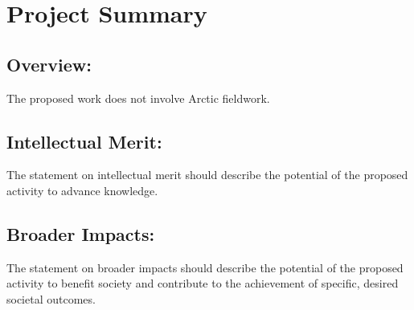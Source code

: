 \section*{\hfil Project Summary\hfil}
\vspace{-16pt}
\noindent\hrulefill





\vspace{-8pt}
\subsection*{Overview:} 
\vspace{-7pt}

The proposed work does not involve Arctic fieldwork.




\vspace{-8pt}
\subsection*{Intellectual Merit:}
\vspace{-7pt}

The statement on intellectual merit should describe the potential of the proposed activity to advance knowledge.




\vspace{-8pt}
\subsection*{Broader Impacts:} 
\vspace{-7pt}

The statement on broader impacts should describe the potential of the proposed activity to benefit society and contribute to the achievement of specific, desired societal outcomes.